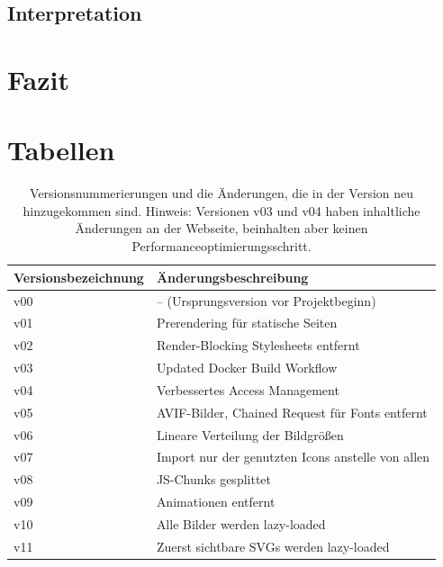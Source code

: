 \documentclass[11pt,a4paper]{article}
\begin{document}
\subsection{Interpretation}
\section{Fazit}

\appendix

\section{Tabellen}

\begin{table}[h]
  \begin{tabular}{|l|l|}
    \hline
    Versionsbezeichnung & Änderungsbeschreibung\\
    \hline
    v00 & -- (Ursprungsversion vor Projektbeginn)\\
    \hline
    v01 & Prerendering für statische Seiten\\
    \hline
    v02 & Render-Blocking Stylesheets entfernt\\
    \hline
    v03 & Updated Docker Build Workflow\\
    \hline
    v04 & Verbessertes Access Management\\
    \hline
    v05 & AVIF-Bilder, Chained Request für Fonts entfernt\\
    \hline
    v06 & Lineare Verteilung der Bildgrößen\\
    \hline
    v07 & Import nur der genutzten Icons anstelle von allen\\
    \hline
    v08 & JS-Chunks gesplittet\\
    \hline
    v09 & Animationen entfernt\\
    \hline
    v10 & Alle Bilder werden lazy-loaded\\
    \hline
    v11 & Zuerst sichtbare SVGs werden lazy-loaded\\
    \hline
  \end{tabular}
  \caption{Versionsnummerierungen und die Änderungen, die in der Version neu hinzugekommen sind. Hinweis: Versionen v03 und v04 haben inhaltliche Änderungen an der Webseite, beinhalten aber keinen Performanceoptimierungsschritt.}\label{tab:versionen}
\end{table}
\end{document}
